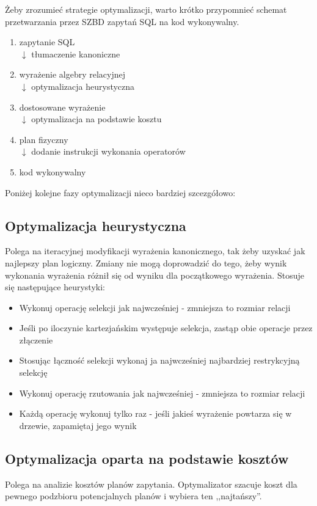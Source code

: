 Żeby zrozumieć strategie optymalizacji, warto krótko przypomnieć schemat przetwarzania przez SZBD zapytań SQL na kod wykonywalny.
\begin{enumerate}
    \item zapytanie SQL \\
    \( \downarrow \) tłumaczenie kanoniczne
    \item wyrażenie algebry relacyjnej \\
    \( \downarrow \) optymalizacja heurystyczna
    \item dostosowane wyrażenie \\
    \( \downarrow \) optymalizacja na podstawie kosztu
    \item plan fizyczny \\
    \( \downarrow \) dodanie instrukcji wykonania operatorów
    \item kod wykonywalny
\end{enumerate}

Poniżej kolejne fazy optymalizacji nieco bardziej szcezgółowo:
\subsection*{Optymalizacja heurystyczna}
Polega na iteracyjnej modyfikacji wyrażenia kanonicznego, tak żeby uzyskać jak najlepszy plan logiczny. Zmiany nie mogą doprowadzić do tego, żeby wynik wykonania wyrażenia różnił się od wyniku dla początkowego wyrażenia.
Stosuje się następujące heurystyki:
\begin{itemize}
    \item Wykonuj operację selekcji jak najwcześniej - zmniejsza to rozmiar relacji
    \item Jeśli po iloczynie kartezjańskim występuje selekcja, zastąp obie operacje przez złączenie
    \item Stosując łączność selekcji wykonaj ja najwcześniej najbardziej restrykcyjną selekcję
    \item Wykonuj operację rzutowania jak najwcześniej - zmniejsza to rozmiar relacji
    \item Każdą operację wykonuj tylko raz - jeśli jakieś wyrażenie powtarza się w drzewie, zapamiętaj jego wynik
\end{itemize}

\subsection*{Optymalizacja oparta na podstawie kosztów}
Polega na analizie kosztów planów zapytania. Optymalizator szacuje koszt dla pewnego
podzbioru potencjalnych planów i wybiera ten ,,najtańszy''.

